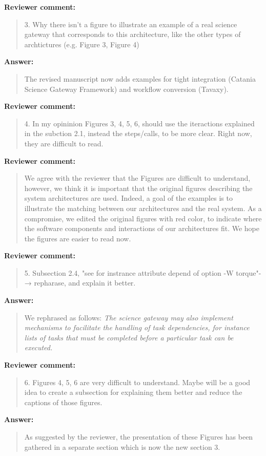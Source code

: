 \documentclass[a4]{article}
\newenvironment{review}%
{\textbf{Reviewer comment:}\begin{quote}}%
{\end{quote}}%
\newenvironment{answer}%
{\textbf{Answer:}\begin{small}\begin{quote}}%
{\end{quote}\end{small}}%
\begin{document}
\begin{review}
  3. Why there isn't a figure to illustrate an example of a real
  science gateway that corresponds to this architecture, like the
  other types of archtictures (e.g. Figure 3, Figure 4)
\end{review}

\begin{answer}
  The revised manuscript now adds examples for tight integration
  (Catania Science Gateway Framework) and workflow conversion
  (Tavaxy).
\end{answer}

\begin{review}
  4. In my opininion Figures 3, 4, 5, 6, should use the iteractions
  explained in the subction 2.1, instead the steps/calls, to be more
  clear. Right now, they are difficult to read.
\end{review}

\begin{review}
  We agree with the reviewer that the Figures are difficult to
  understand, however, we think it is important that the original
  figures describing the system architectures are used. Indeed, a goal
  of the examples is to illustrate the matching between our
  architectures and the real system. As a compromise, we edited the
  original figures with red color, to indicate where the software
  components and interactions of our architectures fit. We hope the
  figures are easier to read now.
\end{review}

\begin{review}
  5.  Subsection 2.4, "see for instrance attribute depend of option -W
  torque"-→ repharase, and explain it better.
\end{review}

\begin{answer}
We rephrased as follows:
\emph{The science gateway may also implement mechanisms to facilitate the handling of task
dependencies, for instance lists of tasks that must
be completed before a particular task can be executed.}
\end{answer}

\begin{review}
6.  Figures 4, 5, 6 are very difficult to understand. Maybe will be a
good idea to create a subsection for explaining them better and reduce
the captions of those figures.
\end{review}

\begin{answer}
  As suggested by the reviewer, the presentation of these Figures has
  been gathered in a separate section which is now the new section 3.
\end{answer}
\end{document}
